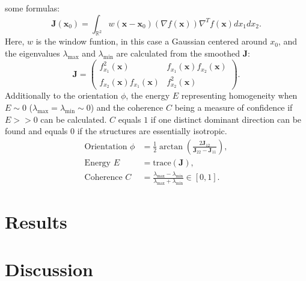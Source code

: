 \documentclass[12pt,oneside,ngerman,reqno,a4paper]{article}
\numberwithin{equation}{section}
\begin{document}
some formulas:
\begin{equation}
\boldsymbol J(\boldsymbol x_{0})=\int_{\mathbb{R}^{2}} w(\boldsymbol x-\boldsymbol x_{0})(\nabla f(\boldsymbol x))\nabla^{T}f(\boldsymbol x)dx_{1}dx_{2}.
\end{equation}
Here, \(w\) is the window funtion, in this case a Gaussian centered around \(x_{0}\), and the eigenvalues \(\lambda_{\max}\) and \(\lambda_{\min}\) are calculated from the smoothed \(\boldsymbol J\):
\begin{equation}
\boldsymbol J=
\begin{pmatrix}
f_{x_{1}}^{2}(\boldsymbol x) & f_{x_{1}}(\boldsymbol x)f_{x_{2}}(\boldsymbol x) \\
f_{x_{2}}(\boldsymbol x)f_{x_{1}}(\boldsymbol x) & f_{x_{2}}^{2}(\boldsymbol x)
\end{pmatrix}.
\end{equation}
Additionally to the orientation \(\phi\), the energy \(E\) representing homogeneity when \(E \sim 0\) (\(\lambda_{\max} =\lambda_{\min} \sim 0\)) and the coherence \(C\) being a measure of confidence if \(E >> 0\) can be calculated. \(C\) equals \(1\) if one distinct dominant direction can be found and equals \(0\) if the structures are essentially isotropic. 
\begin{subequations}
	\begin{align}
	\text{Orientation } \phi&=\frac{1}{2} \arctan(\frac{2 \boldsymbol J_{12}}{\boldsymbol J_{22}-\boldsymbol J_{11}}), \\
	\text{Energy } E&=\text{trace}(\boldsymbol J), \\
	\text{Coherence } C &= \frac{\lambda_{\max}-\lambda_{\min}}{\lambda_{\max}+\lambda_{\min}} \in [0,1].	
	\end{align}
\end{subequations}

\newpage
\section{Results}

\newpage
\section{Discussion}


\newpage
\listoffigures
\newpage
\listoftables
\newpage


\clearpage\thispagestyle{empty}
\end{document}
